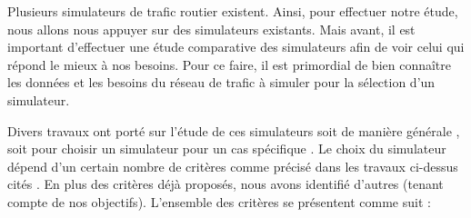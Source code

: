 Plusieurs simulateurs de trafic routier existent. Ainsi, pour effectuer notre étude, nous allons nous appuyer sur des simulateurs existants. Mais avant, il est important d'effectuer une étude comparative des simulateurs afin de voir celui qui répond le mieux à nos besoins. Pour ce faire, il est primordial de bien connaître les données et les besoins du réseau de trafic à simuler pour la sélection d'un simulateur.

Divers travaux ont porté sur l'étude de ces simulateurs soit de manière générale \cite{kotusevski2009review,xiao2005methodology}, soit pour choisir un simulateur pour un cas spécifique \cite{ejercito2017traffic}. 
Le choix du simulateur dépend d'un certain nombre de critères comme précisé dans les travaux ci-dessus cités \cite{kotusevski2009review,xiao2005methodology,ejercito2017traffic}. En plus des critères déjà proposés, nous avons identifié d'autres (tenant compte de nos objectifs). L'ensemble des critères se présentent comme suit : 


